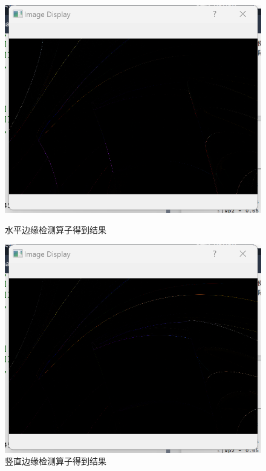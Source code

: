 \documentclass[a4paper,12pt]{article}
\begin{document}
\begin{figure}[h!]
    \vspace{0.2cm}
    
    \begin{minipage}[b]{0.48\textwidth}
        \centering
        \includegraphics[width=\linewidth]{images/Design/image_processing/1/horizontal.png}
        \caption{水平边缘检测算子得到结果}
    \end{minipage}
    \hfill
    \begin{minipage}[b]{0.48\textwidth}
        \centering
        \includegraphics[width=\linewidth]{images/Design/image_processing/1/vertical.png}
        \caption{竖直边缘检测算子得到结果}
    \end{minipage}
\end{figure}
\end{document}
